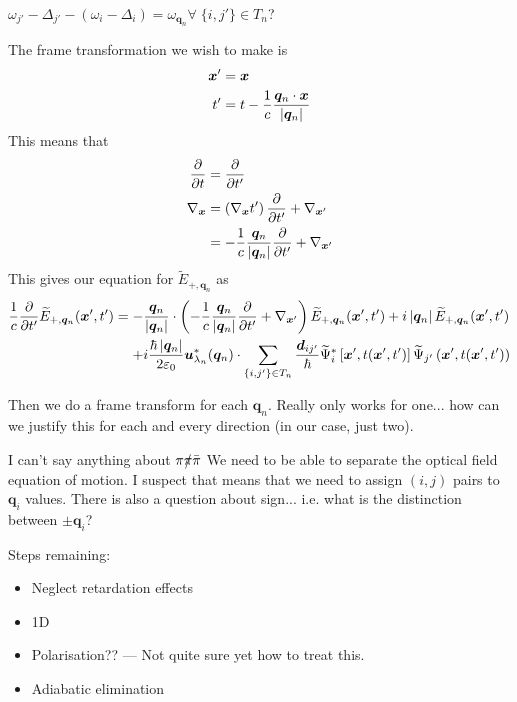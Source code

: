 $\omega_{j'} - \Delta_{j'} - (\omega_i - \Delta_i) = \omega_{\bm{q}_n} \forall \; \{i, j'\} \in T_n$? 

The frame transformation we wish to make is
\begin{align}
  \bm{x}' &= \bm{x} \\
  t' &= t - \frac{1}{c} \frac{\bm{q}_n \cdot \bm{x}}{\left|\bm{q}_n\right|} 
\end{align}
This means that
\begin{align}
  \frac{\partial}{\partial t} &= \frac{\partial }{\partial t'}\\
  \nabla_{\bm{x}} &= \left(\nabla_{\bm{x}} t'\right) \frac{\partial }{\partial t'} + \nabla_{\bm{x}'}\\
  &= - \frac{1}{c} \frac{\bm{q}_n}{\left|\bm{q}_n\right|}\frac{\partial}{\partial t'} + \nabla_{\bm{x}'}
\end{align}
This gives our equation for $\widetilde{E}_{+, \bm{q}_n}$ as
\begin{align}
  \begin{split}
    \frac{1}{c} \frac{\partial}{\partial t'} \widetilde{E}_{+, \bm{q}_n} (\bm{x}', t') &= - \frac{\bm{q}_n}{\abs{\bm{q}_n}} \cdot \left(- \frac{1}{c} \frac{\bm{q}_n}{ \abs{\bm{q}_n}} \frac{\partial}{\partial t'} + \nabla_{\bm{x}'} \right) \widetilde{E}_{+, \bm{q}_n}(\bm{x}', t') + i \abs{\bm{q}_n} \widetilde{E}_{+, \bm{q}_n}(\bm{x}', t')\\
    &\relphantom{=} + i \frac{\hbar \abs{\bm{q}_n}}{2 \varepsilon_0} \bm{u}^*_{\lambda_n}(\bm{q}_n) \cdot \sum_{\{i,j'\}\in T_n} \frac{\bm{d}_{ij'}}{\hbar} \widetilde{\Psi}^*_i\left[\bm{x}', t(\bm{x}', t')\right] \widetilde{\Psi}_{j'}\left(\bm{x}', t(\bm{x}', t')\right)
  \end{split}
\end{align}



Then we do a frame transform for each $\bm{q}_n$.  Really only works for one... how can we justify this for each and every direction (in our case, just two).

I can't say anything about ${\pi\slashed{\pi}}\bar{\pi}$ We need to be able to separate the optical field equation of motion.  I suspect that means that we need to assign $\left(i, j\right)$ pairs to $\bm{q}_i$ values.  There is also a question about sign... i.e. what is the distinction between $\pm \bm{q}_i$?



Steps remaining:
\begin{itemize}
    \item Neglect retardation effects
    \item 1D
    \item Polarisation?? --- Not quite sure yet how to treat this.
    \item Adiabatic elimination
\end{itemize}

